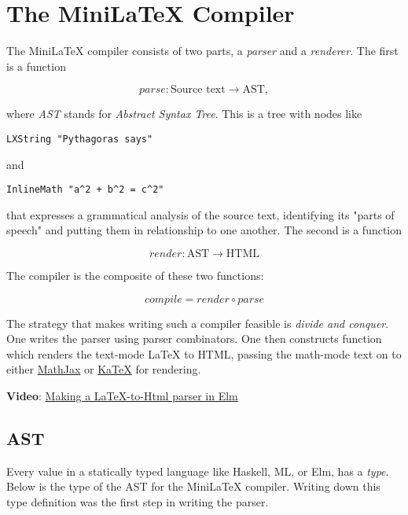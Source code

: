 \documentclass[11pt, oneside]{article}
\newcommand{\italic}[1]{{\sl #1}}
\newcommand{\strong}[1]{{\bf #1}}
\begin{document}
 \section{The  MiniLaTeX  Compiler}
The  MiniLaTeX  compiler  consists  of  two  parts,  a   \italic{parser} and  a   \italic{renderer}.   The  first  is  a  function


$$
parse: \text{Source text} \to \text{AST},
$$

where   \italic{AST} stands  for   \italic{Abstract  Syntax  Tree}.   This  is  a  tree  with  nodes  like


\begin{verbatim}
LXString "Pythagoras says"
\end{verbatim}

and


\begin{verbatim}
InlineMath "a^2 + b^2 = c^2"
\end{verbatim}

that  expresses  a  grammatical  analysis  of  the  source  text,  identifying  its  "parts  of  speech"  and  putting  them  in  relationship  to  one  another.
 The  second  is  a  function


$$
render: \text{AST} \to \text{HTML}
$$

The  compiler  is  the  composite  of  these  two  functions:


$$
compile   = render \circ parse
$$

The  strategy  that  makes  writing  such  a  compiler  feasible  is   \italic{divide  and  conquer}.   One  writes  the  parser  using  parser  combinators.   One  then  constructs  function  which  renders  the  text-mode  LaTeX  to  HTML,  passing  the  math-mode  text  on  to  either   \href{https://mathjax.org}{MathJax} or   \href{https://katex.org}{KaTeX} for  rendering.


 \strong{Video}:   \href{https://www.youtube.com/watch?v=dmDA7iziSgs&t=15s}{Making  a  LaTeX-to-Html  parser  in  Elm}

 \subsection{AST}
Every  value  in  a  statically  typed  language  like  Haskell,  ML,  or  Elm,  has  a   \italic{type}.   Below  is  the  type  of  the AST  for  the  MiniLaTeX  compiler.   Writing  down  this  type  definition  was  the  first  step  in  writing  the  parser.
\end{document}
